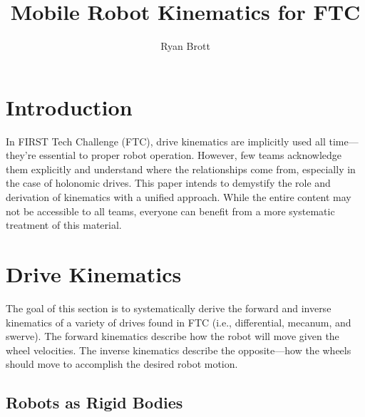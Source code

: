 \documentclass{article}
\title{Mobile Robot Kinematics for FTC}
\author{Ryan Brott}
\date{}
\begin{document}
\maketitle

\section{Introduction}


In FIRST Tech Challenge (FTC), drive kinematics are implicitly used all time---they're essential to proper robot operation. However, few teams acknowledge them explicitly and understand where the relationships come from, especially in the case of holonomic drives. This paper intends to demystify the role and derivation of kinematics with a unified approach. While the entire content may not be accessible to all teams, everyone can benefit from a more systematic treatment of this material.

\section{Drive Kinematics}

The goal of this section is to systematically derive the forward and inverse kinematics of a variety of drives found in FTC (i.e., differential, mecanum, and swerve). The forward kinematics describe how the robot will move given the wheel velocities. The inverse kinematics describe the opposite---how the wheels should move to accomplish the desired robot motion. 

\subsection{Robots as Rigid Bodies}
\end{document}
